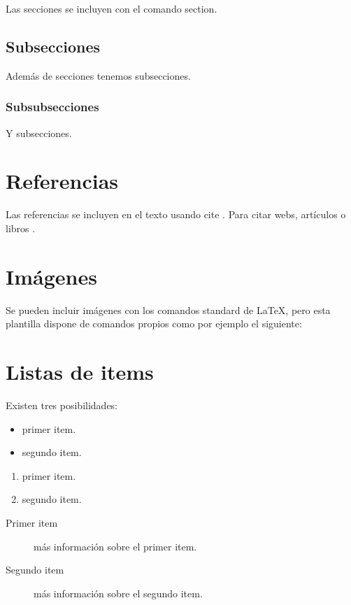 Las secciones se incluyen con el comando section.

\subsection{Subsecciones}

Además de secciones tenemos subsecciones.

\subsubsection{Subsubsecciones}

Y subsecciones. 


\section{Referencias}

Las referencias se incluyen en el texto usando cite \cite{wiki:latex}. Para citar webs, artículos o libros \cite{koza92}.


\section{Imágenes}

Se pueden incluir imágenes con los comandos standard de \LaTeX, pero esta plantilla dispone de comandos propios como por ejemplo el siguiente:




\section{Listas de items}

Existen tres posibilidades:

\begin{itemize}
	\item primer item.
	\item segundo item.
\end{itemize}

\begin{enumerate}
	\item primer item.
	\item segundo item.
\end{enumerate}

\begin{description}
	\item[Primer item] más información sobre el primer item.
	\item[Segundo item] más información sobre el segundo item.
\end{description}
	
